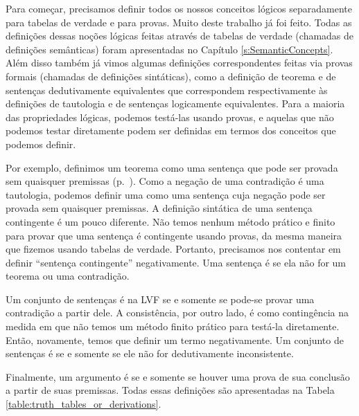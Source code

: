 Para começar, precisamos definir todos os nossos conceitos lógicos separadamente para tabelas de verdade e  para provas. Muito deste trabalho já foi feito. 
Todas as definições dessas noções lógicas feitas através de tabelas de verdade (chamadas de definições semânticas) foram apresentadas no  Capítulo \ref{s:SemanticConcepts}. Além disso também já vimos algumas definições correspondentes feitas via provas formais (chamadas de definições sintáticas), como a definição de teorema e de sentenças dedutivamente equivalentes que correspondem respectivamente às definições de tautologia e de sentenças logicamente equivalentes.
Para a maioria das propriedades lógicas, podemos testá-las usando provas, e aquelas que não podemos testar diretamente podem ser definidas em termos dos conceitos que podemos definir.

Por exemplo, definimos um teorema como uma sentença que pode ser provada sem quaisquer premissas (p.~\pageref{def:syntactic_tautology_in_sl}). Como a negação de uma contradição é uma tautologia, podemos definir uma  \label{def:syntactic_contradiction_in_sl} como uma sentença cuja negação pode ser provada sem quaisquer premissas. A definição sintática de uma sentença contingente é um pouco diferente. Não temos nenhum método prático e finito para provar que uma sentença é contingente usando provas, da mesma maneira que fizemos usando tabelas de verdade. Portanto, precisamos nos contentar em definir ``sentença contingente'' negativamente. Uma sentença é  \label{def:syntactically_contingent_in_sl} se ela  não for um teorema ou uma contradição. 
 

Um  conjunto de sentenças é  na LVF \label{def:syntactically_inconsistent_ in_sl}  se e somente se pode-se provar uma contradição a partir dele. A consistência, por outro lado, é como contingência na medida em que não temos um método finito prático para testá-la diretamente. Então, novamente, temos que definir um termo negativamente. Um  conjunto de sentenças é  \label{def:syntactically consistent in SL} se e somente se ele não for dedutivamente inconsistente.
    
Finalmente, um argumento é   \label{def:syntactically_valid_in_SL}se e somente se houver uma prova de sua conclusão a partir de suas premissas. Todas essas definições são apresentadas na Tabela \ref{table:truth_tables_or_derivations}.

